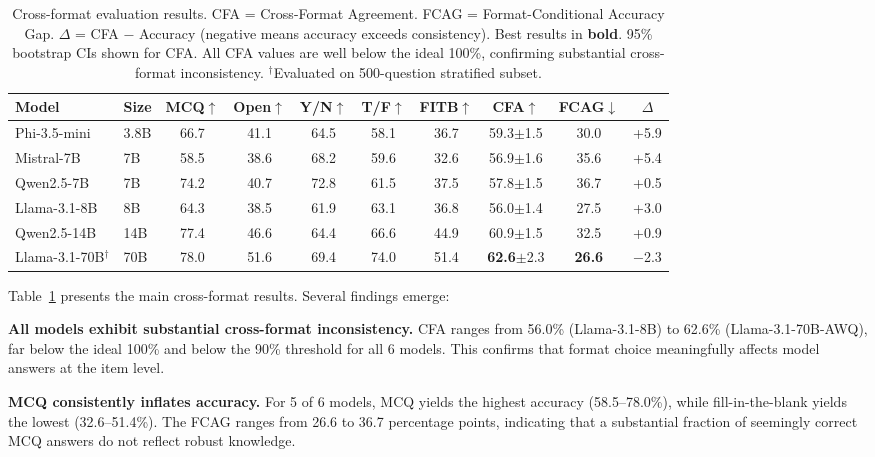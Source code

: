 \documentclass{article}
\begin{document}
\begin{table}[t]
\caption{Cross-format evaluation results. CFA = Cross-Format Agreement. FCAG = Format-Conditional Accuracy Gap. $\Delta$ = CFA $-$ Accuracy (negative means accuracy exceeds consistency). Best results in \textbf{bold}. 95\% bootstrap CIs shown for CFA. All CFA values are well below the ideal 100\%, confirming substantial cross-format inconsistency. $^\dagger$Evaluated on 500-question stratified subset.}
\label{tab:main}
\centering
\small
\begin{tabular}{llcccccccc}
\toprule
Model & Size & MCQ$\uparrow$ & Open$\uparrow$ & Y/N$\uparrow$ & T/F$\uparrow$ & FITB$\uparrow$ & CFA$\uparrow$ & FCAG$\downarrow$ & $\Delta$ \\
\midrule
Phi-3.5-mini & 3.8B & 66.7 & 41.1 & 64.5 & 58.1 & 36.7 & 59.3{\scriptsize$\pm$1.5} & 30.0 & +5.9 \\
Mistral-7B & 7B & 58.5 & 38.6 & 68.2 & 59.6 & 32.6 & 56.9{\scriptsize$\pm$1.6} & 35.6 & +5.4 \\
Qwen2.5-7B & 7B & 74.2 & 40.7 & 72.8 & 61.5 & 37.5 & 57.8{\scriptsize$\pm$1.5} & 36.7 & +0.5 \\
Llama-3.1-8B & 8B & 64.3 & 38.5 & 61.9 & 63.1 & 36.8 & 56.0{\scriptsize$\pm$1.4} & 27.5 & +3.0 \\
Qwen2.5-14B & 14B & 77.4 & 46.6 & 64.4 & 66.6 & 44.9 & 60.9{\scriptsize$\pm$1.5} & 32.5 & +0.9 \\
Llama-3.1-70B$^\dagger$ & 70B & 78.0 & 51.6 & 69.4 & 74.0 & 51.4 & \textbf{62.6}{\scriptsize$\pm$2.3} & \textbf{26.6} & $-$2.3 \\
\bottomrule
\end{tabular}
\end{table}

Table~\ref{tab:main} presents the main cross-format results. Several findings emerge:

\textbf{All models exhibit substantial cross-format inconsistency.} CFA ranges from 56.0\% (Llama-3.1-8B) to 62.6\% (Llama-3.1-70B-AWQ), far below the ideal 100\% and below the 90\% threshold for all 6 models. This confirms that format choice meaningfully affects model answers at the item level.

\textbf{MCQ consistently inflates accuracy.} For 5 of 6 models, MCQ yields the highest accuracy (58.5--78.0\%), while fill-in-the-blank yields the lowest (32.6--51.4\%). The FCAG ranges from 26.6 to 36.7 percentage points, indicating that a substantial fraction of seemingly correct MCQ answers do not reflect robust knowledge.
\end{document}
